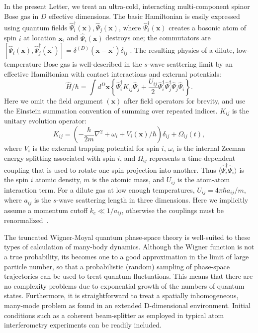 \documentclass[aps,prl,twocolumn,showpacs,amsmath,amssymb,superscriptaddress]{revtex4-1}
\newcommand{\xvec}{\boldsymbol{x}}
\begin{document}
In the present Letter, we treat an ultra-cold,
interacting multi-component spinor Bose gas in $D$ effective dimensions.
The basic Hamiltonian is easily expressed using quantum fields
$\widehat{\Psi}_{i}^{\dagger}(\xvec),\widehat{\Psi}_{j}(\xvec)$,
where $\widehat{\Psi}_{i}^{\dagger}(\xvec)$ creates a bosonic atom of spin $i$
at location $\xvec$, and $\widehat{\Psi}_{i}(\xvec)$ destroys one;
the commutators are
$[\widehat{\Psi}_{i}(\xvec),\widehat{\Psi}_{j}^{\dagger}(\xvec^\prime)] =
\delta^{(D)}(\xvec-\xvec^\prime)\delta_{ij}\,\,.$
The resulting physics of a dilute, low-temperature Bose gas
is well-described in the $s$-wave scattering limit by an effective Hamiltonian
with contact interactions and external potentials:
\begin{equation}
	\hat{H} / \hbar = \int d^{D}\xvec \left\{
		\widehat{\Psi}_{i}^{\dagger} K_{ij} \widehat{\Psi}_{j} +
		\frac{U_{ij}}{2} \widehat{\Psi}_{i}^{\dagger} \widehat{\Psi}_{j}^{\dagger}
		\widehat{\Psi}_{j} \widehat{\Psi}_{i}
	\right\}.
\end{equation}
Here we omit the field argument $(\xvec)$ after field operators for brevity,
and use the Einstein summation convention of summing over repeated indices.
$K_{ij}$ is the unitary evolution operator:
\begin{equation}
	K_{ij} = \left( -\frac{\hbar}{2m} \nabla^2 + \omega_i + V_i(\xvec) / \hbar \right) \delta_{ij} +
		\Omega_{ij}(t),
\end{equation}
where $V_{i}$ is the external trapping potential for spin $i$,
$\omega_{i}$ is the internal Zeeman energy splitting associated with spin $i$,
and $\Omega_{ij}$ represents a time-dependent coupling
that is used to rotate one spin projection into another.
Thus $\langle \widehat{\Psi}_{i}^{\dagger} \widehat{\Psi}_{i} \rangle$
is the spin $i$ atomic density, $m$ is the atomic mass,
and $U_{ij}$ is the atom-atom interaction term.
For a dilute gas at low enough temperatures,
$U_{ij}=4\pi\hbar a_{ij} / m$, where $a_{ij}$ is the $s$-wave scattering length in three dimensions.
Here we implicitly assume a momentum cutoff $k_{c} \ll 1 / a_{ij}$,
otherwise the couplings must be renormalized~\cite{Sinatra2002}.

The truncated Wigner-Moyal quantum phase-space theory is well-suited
to these types of calculation of many-body dynamics.
Although the Wigner function is not a true probability,
its becomes one to a good approximation in the limit of large particle number,
so that a probabilistic (random) sampling of phase-space trajectories
can be used to treat quantum fluctuations.
This means that there are no complexity problems due to exponential growth
of the numbers of quantum states.
Furthermore, it is straightforward to treat a spatially inhomogeneous,
many-mode problem as found in an extended D-dimensional environment.
Initial conditions such as a coherent beam-splitter
as employed in typical atom interferometry experiments can be readily included.
\end{document}
